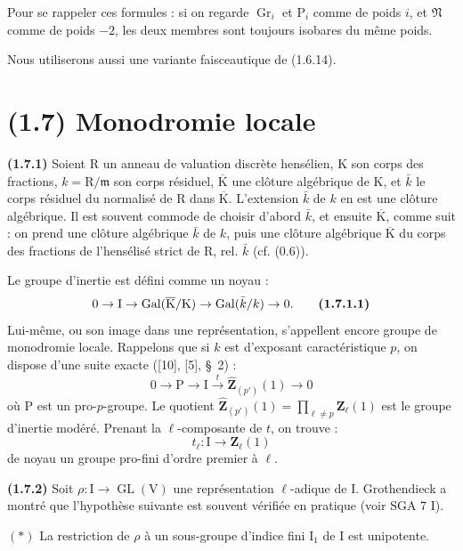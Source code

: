 \documentclass[11pt,leqno]{article}
\begin{document}
Pour se rappeler ces formules : si on regarde \(\operatorname{Gr}_i\) et \(\mathrm{P}_i\) comme de poids \(i\), et \(\mathfrak{N}\) comme de poids \(-2\), les deux membres sont toujours isobares du même poids.

Nous utiliserons aussi une variante faisceautique de (1.6.14).

\section*{(1.7) Monodromie locale}

\textbf{(1.7.1)} Soient \(\mathrm{R}\) un anneau de valuation discrète hensélien, \(\mathrm{K}\) son corps des fractions, \(k=\mathrm{R}/\mathfrak{m}\) son corps résiduel, \(\overline{\mathrm{K}}\) une clôture algébrique de \(\mathrm{K}\), et \(\bar{k}\) le corps résiduel du normalisé de \(\mathrm{R}\) dans \(\overline{\mathrm{K}}\). L’extension \(\bar{k}\) de \(k\) en est une clôture algébrique. Il est souvent commode de choisir d’abord \(\bar{k}\), et ensuite \(\overline{\mathrm{K}}\), comme suit : on prend une clôture algébrique \(\bar{k}\) de \(k\), puis une clôture algébrique \(\overline{\mathrm{K}}\) du corps des fractions de l’hensélisé strict de \(\mathrm{R}\), rel. \(\bar{k}\) (cf. (0.6)).

Le groupe d’inertie est défini comme un noyau :
\[
0\to\mathrm{I}\to
\operatorname{Gal}(\overline{\mathrm{K}}/\mathrm{K})
\to\operatorname{Gal}(\bar{k}/k)\to0.
\tag*{\textbf{(1.7.1.1)}}
\]
Lui-même, ou son image dans une représentation, s’appellent encore groupe de monodromie locale. Rappelons que si \(k\) est d’exposant caractéristique \(p\), on dispose d’une suite exacte ([10], [5], \S~2) :
\[
0\to\mathrm{P}\to\mathrm{I}
\xrightarrow{t}\widehat{\mathbf{Z}}_{(p')}(1)\to0
\]
où \(\mathrm{P}\) est un pro-\(p\)-groupe. Le quotient \(\widehat{\mathbf{Z}}_{(p')}(1)=\prod\limits_{\ell\neq p}\mathbf{Z}_\ell(1)\) est le groupe d’inertie modéré. Prenant la \(\ell\)-composante de \(t\), on trouve :
\[
t_\ell:\mathrm{I}\to\mathbf{Z}_\ell(1)
\]
de noyau un groupe pro-fini d’ordre premier à \(\ell\).

\textbf{(1.7.2)} Soit \(\rho:\mathrm{I}\to\operatorname{GL}(\mathrm{V})\) une représentation \(\ell\)-adique de \(\mathrm{I}\). Grothendieck a montré que l’hypothèse suivante est souvent vérifiée en pratique (voir SGA 7 I).

\((*)\) La restriction de \(\rho\) à un sous-groupe d’indice fini \(\mathrm{I}_1\) de \(\mathrm{I}\) est unipotente.
\end{document}
